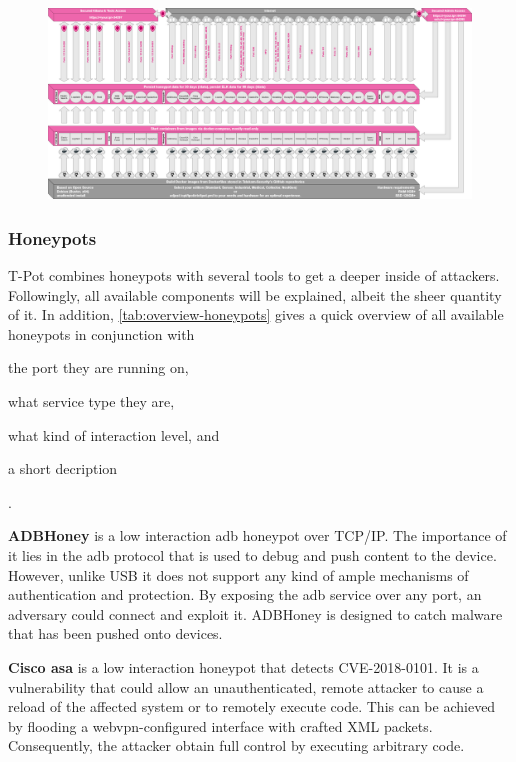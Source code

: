 \begin{figure}
    \centering
    \includegraphics[width=\textwidth]{figures/architecture.png}
    \caption{}
    \label{fig:overview-tpot}
\end{figure}

\subsubsection{Honeypots}

T-Pot combines honeypots with several tools to get a deeper inside of attackers.
Followingly, all available components will be explained, albeit the sheer quantity of it.
In addition, \autoref{tab:overview-honeypots} gives a quick overview of all available honeypots in conjunction with
\begin{enumerate*}[label=(\roman*)]
    \item the port they are running on,
    \item what service type they are,
    \item what kind of interaction level, and
    \item a short decription
\end{enumerate*}.

\textbf{ADBHoney} \cite{adbhoney2021} is a low interaction \ac{adb} honeypot over TCP/IP.
The importance of it lies in the \ac{adb} protocol that is used to debug and push content to the device.
However, unlike USB it does not support any kind of ample mechanisms of authentication and protection.
By exposing the \ac{adb} service over any port, an adversary could connect and exploit it.
ADBHoney is designed to catch malware that has been pushed onto devices.

\textbf{Cisco \ac{asa}} \cite{cymmetria2018} is a low interaction honeypot that detects CVE-2018-0101\cite{CVE-2018-0101}.
It is a vulnerability that could allow an unauthenticated, remote attacker to cause a reload of the affected system or to remotely execute code.
This can be achieved by flooding a webvpn-configured interface with crafted XML packets.
Consequently, the attacker obtain full control by executing arbitrary code.


